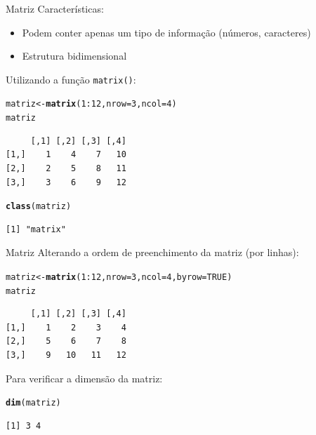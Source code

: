 \documentclass[10pt,handout]{beamer}\usepackage[]{graphicx}\usepackage[]{color}
\makeatletter
\newcommand{\hlnum}[1]{\textcolor[rgb]{0.686,0.059,0.569}{#1}}%
\newcommand{\hlopt}[1]{\textcolor[rgb]{0,0,0}{#1}}%
\newcommand{\hlstd}[1]{\textcolor[rgb]{0.345,0.345,0.345}{#1}}%
\newcommand{\hlkwb}[1]{\textcolor[rgb]{0.69,0.353,0.396}{#1}}%
\newcommand{\hlkwc}[1]{\textcolor[rgb]{0.333,0.667,0.333}{#1}}%
\newcommand{\hlkwd}[1]{\textcolor[rgb]{0.282,0.239,0.545}{\textbf{#1}}}%
\newenvironment{kframe}{%
 \def\at@end@of@kframe{}%
 \ifinner\ifhmode%
  \def\at@end@of@kframe{\end{minipage}}%
  \begin{minipage}{\columnwidth}%
 \fi\fi%
 \def\FrameCommand##1{\hskip\@totalleftmargin \hskip-\fboxsep
 \colorbox{shadecolor}{##1}\hskip-\fboxsep
     \hskip-\linewidth \hskip-\@totalleftmargin \hskip\columnwidth}%
 \MakeFramed {\advance\hsize-\width
   \@totalleftmargin\z@ \linewidth\hsize
   \@setminipage}}%
 {\par\unskip\endMakeFramed%
 \at@end@of@kframe}
\newenvironment{knitrout}{}{} %
\makeatother
\begin{document}
\begin{frame}[fragile]{Matriz}
Características:
\begin{itemize}
\item Podem conter apenas um tipo de informação (números, caracteres)
\item Estrutura bidimensional
\end{itemize}
Utilizando a função \texttt{matrix()}:
\begin{knitrout}\small
{}\color{fgcolor}\begin{kframe}
\begin{alltt}
\hlstd{matriz} \hlkwb{<-} \hlkwd{matrix}\hlstd{(}\hlnum{1}\hlopt{:}\hlnum{12}\hlstd{,} \hlkwc{nrow} \hlstd{=} \hlnum{3}\hlstd{,} \hlkwc{ncol} \hlstd{=} \hlnum{4}\hlstd{)}
\hlstd{matriz}
\end{alltt}
\begin{verbatim}
     [,1] [,2] [,3] [,4]
[1,]    1    4    7   10
[2,]    2    5    8   11
[3,]    3    6    9   12
\end{verbatim}
\begin{alltt}
\hlkwd{class}\hlstd{(matriz)}
\end{alltt}
\begin{verbatim}
[1] "matrix"
\end{verbatim}
\end{kframe}
\end{knitrout}

\end{frame}

\begin{frame}[fragile]{Matriz}
Alterando a ordem de preenchimento da matriz (por linhas):
\begin{knitrout}\small
{}\color{fgcolor}\begin{kframe}
\begin{alltt}
\hlstd{matriz} \hlkwb{<-} \hlkwd{matrix}\hlstd{(}\hlnum{1}\hlopt{:}\hlnum{12}\hlstd{,} \hlkwc{nrow} \hlstd{=} \hlnum{3}\hlstd{,} \hlkwc{ncol} \hlstd{=} \hlnum{4}\hlstd{,} \hlkwc{byrow} \hlstd{=} \hlnum{TRUE}\hlstd{)}
\hlstd{matriz}
\end{alltt}
\begin{verbatim}
     [,1] [,2] [,3] [,4]
[1,]    1    2    3    4
[2,]    5    6    7    8
[3,]    9   10   11   12
\end{verbatim}
\end{kframe}
\end{knitrout}

Para verificar a dimensão da matriz:
\begin{knitrout}\small
{}\color{fgcolor}\begin{kframe}
\begin{alltt}
\hlkwd{dim}\hlstd{(matriz)}
\end{alltt}
\begin{verbatim}
[1] 3 4
\end{verbatim}
\end{kframe}
\end{knitrout}

\end{frame}
\end{document}
